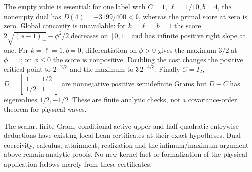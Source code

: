 \begin{remark}\label{R:gram-controls}
  The empty value is essential: for one label with $C=1$,
  $\ell=1/10,b=4$, the nonempty dual has
  $D(4)=-3199/400<0$, whereas the primal score at zero is zero.
  Global concavity is unavailable: for $k=\ell=b=1$ the score
  $2\sqrt{(\phi-1)_+}-\phi^2/2$ decreases on $[0,1]$ and has infinite
  positive right slope at one.
  For $k=\ell=1,b=0$, differentiation on $\phi>0$ gives the maximum
  $3/2$ at $\phi=1$; on $\phi\le0$ the score is nonpositive.
  Doubling the cost changes the positive critical point to $2^{-2/3}$
  and the maximum to $3\,2^{-4/3}$.
  Finally $C=I_2$, $D=\left[\begin{smallmatrix}1&1/2\\1/2&1\end{smallmatrix}\right]$
  are nonnegative positive semidefinite Grams but $D-C$ has eigenvalues
  $1/2,-1/2$. These are finite analytic checks, not a covariance-order
  theorem for physical waves.

  The scalar, finite Gram, conditional active upper and half-quadratic
  entrywise deductions have existing local Lean certificates at their
  exact hypotheses. Dual coercivity, calculus, attainment, realization
  and the infimum/maximum argument above remain analytic proofs.
  No new kernel fact or formalization of the physical application follows
  merely from these certificates.
\end{remark}
